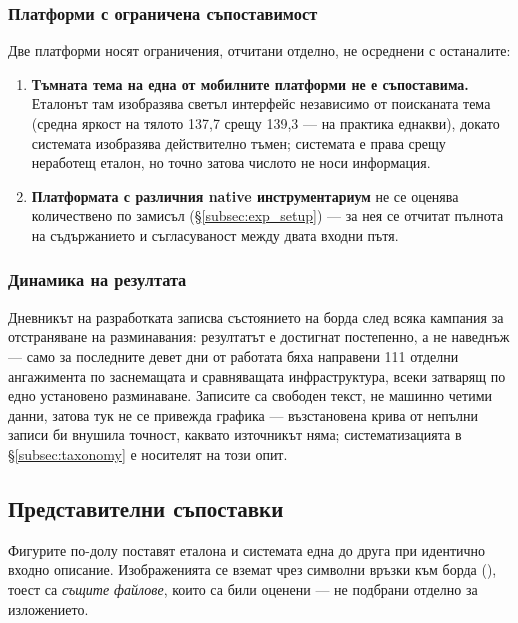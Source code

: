 \subsubsection{Платформи с ограничена съпоставимост}

Две платформи носят ограничения, отчитани отделно, не осреднени с останалите:

\begin{enumerate}[topsep=2pt,itemsep=1pt,leftmargin=*]
\item \textbf{Тъмната тема на една от мобилните платформи не е съпоставима.} Еталонът там
      изобразява светъл интерфейс независимо от поисканата тема (средна яркост на тялото 137,7
      срещу 139,3 --- на практика еднакви), докато системата изобразява действително тъмен;
      системата е права срещу неработещ еталон, но точно затова числото не носи информация.
\item \textbf{Платформата с различния native инструментариум} не се оценява количествено по замисъл
      (§\ref{subsec:exp_setup}) --- за нея се отчитат пълнота на съдържанието и съгласуваност между
      двата входни пътя.
\end{enumerate}

\subsubsection{Динамика на резултата}

Дневникът на разработката записва състоянието на борда след всяка кампания за отстраняване на
разминавания: резултатът е достигнат постепенно, а не наведнъж --- само за последните девет дни от
работата бяха направени 111 отделни ангажимента по заснемащата и сравняващата инфраструктура, всеки
затварящ по едно установено разминаване. Записите са свободен текст, не машинно четими данни, затова
тук не се привежда графика --- възстановена крива от непълни записи би внушила точност, каквато
източникът няма; систематизацията в §\ref{subsec:taxonomy} е носителят на този опит.

\subsection{Представителни съпоставки}
\label{subsec:visual}

Фигурите по-долу поставят еталона и системата една до друга при идентично входно описание.
Изображенията се вземат чрез символни връзки към борда (), тоест са
\emph{същите файлове}, които са били оценени --- не подбрани отделно за изложението.

